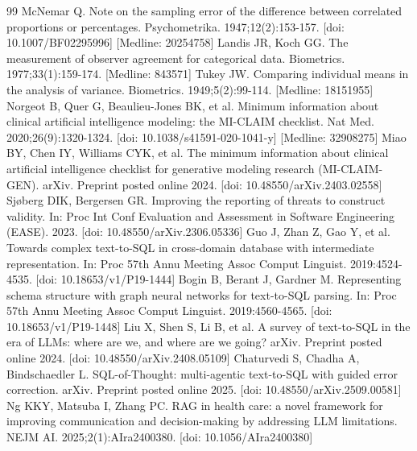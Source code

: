 \documentclass[10pt,twocolumn]{article}
\begin{document}
\begin{thebibliography}{99}
 McNemar Q. Note on the sampling error of the difference between correlated proportions or percentages. Psychometrika. 1947;12(2):153-157. [doi: 10.1007/BF02295996] [Medline: 20254758]
 Landis JR, Koch GG. The measurement of observer agreement for categorical data. Biometrics. 1977;33(1):159-174. [Medline: 843571]
 Tukey JW. Comparing individual means in the analysis of variance. Biometrics. 1949;5(2):99-114. [Medline: 18151955]
 Norgeot B, Quer G, Beaulieu-Jones BK, et al. Minimum information about clinical artificial intelligence modeling: the MI-CLAIM checklist. Nat Med. 2020;26(9):1320-1324. [doi: 10.1038/s41591-020-1041-y] [Medline: 32908275]
 Miao BY, Chen IY, Williams CYK, et al. The minimum information about clinical artificial intelligence checklist for generative modeling research (MI-CLAIM-GEN). arXiv. Preprint posted online 2024. [doi: 10.48550/arXiv.2403.02558]
 Sj\o{}berg DIK, Bergersen GR. Improving the reporting of threats to construct validity. In: Proc Int Conf Evaluation and Assessment in Software Engineering (EASE). 2023. [doi: 10.48550/arXiv.2306.05336]
 Guo J, Zhan Z, Gao Y, et al. Towards complex text-to-SQL in cross-domain database with intermediate representation. In: Proc 57th Annu Meeting Assoc Comput Linguist. 2019:4524-4535. [doi: 10.18653/v1/P19-1444]
 Bogin B, Berant J, Gardner M. Representing schema structure with graph neural networks for text-to-SQL parsing. In: Proc 57th Annu Meeting Assoc Comput Linguist. 2019:4560-4565. [doi: 10.18653/v1/P19-1448]
 Liu X, Shen S, Li B, et al. A survey of text-to-SQL in the era of LLMs: where are we, and where are we going? arXiv. Preprint posted online 2024. [doi: 10.48550/arXiv.2408.05109]
 Chaturvedi S, Chadha A, Bindschaedler L. SQL-of-Thought: multi-agentic text-to-SQL with guided error correction. arXiv. Preprint posted online 2025. [doi: 10.48550/arXiv.2509.00581]
 Ng KKY, Matsuba I, Zhang PC. RAG in health care: a novel framework for improving communication and decision-making by addressing LLM limitations. NEJM AI. 2025;2(1):AIra2400380. [doi: 10.1056/AIra2400380]
\end{thebibliography}

\end{document}
